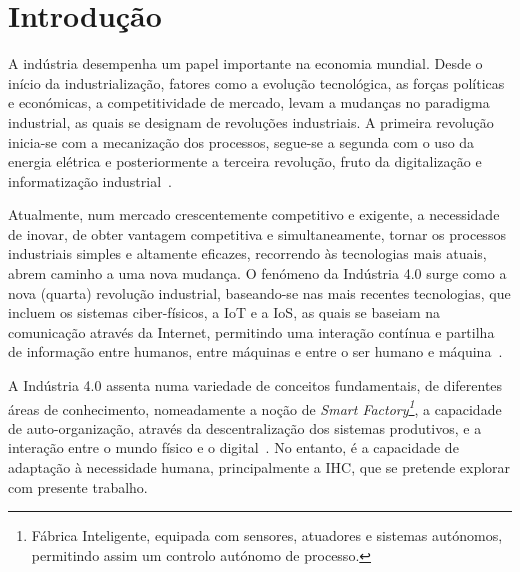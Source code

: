 \chapter{Introdução}
\label{chap:Chapter1}

A indústria desempenha um papel importante na economia mundial. Desde o início da industrialização, fatores como a evolução tecnológica, as forças políticas e económicas, a competitividade de mercado, levam a mudanças no paradigma industrial, as quais se designam de revoluções industriais. A primeira revolução inicia-se com a mecanização dos processos, segue-se a segunda com o uso da energia elétrica e posteriormente a terceira revolução, fruto da digitalização e informatização industrial~\parencite{industry40, modern_industrial_revolution_exit_failure_internal_control_systems}.

Atualmente, num mercado crescentemente competitivo e exigente, a necessidade de inovar, de obter vantagem competitiva e simultaneamente, tornar os processos industriais simples e altamente eficazes, recorrendo às tecnologias mais atuais, abrem caminho a uma nova mudança. O fenómeno da Indústria 4.0 surge como a nova (quarta) revolução industrial, baseando-se nas mais recentes tecnologias, que incluem os sistemas ciber-físicos, a \gls{IoT} e a \gls{IoS}, as quais se baseiam na comunicação através da Internet, permitindo uma interação contínua e partilha de informação entre humanos, entre máquinas e entre o ser humano e máquina~\parencite{complex_view_industry40}. 

A Indústria 4.0 assenta numa variedade de conceitos fundamentais, de diferentes áreas de conhecimento, nomeadamente a noção de \textit{Smart Factory\footnote{Fábrica Inteligente, equipada com sensores, atuadores e sistemas autónomos, permitindo assim um controlo autónomo de processo.}}, a capacidade de auto-organização, através da descentralização dos sistemas produtivos, e a interação entre o mundo físico e o digital~\parencite[Fundamental Concepts, p.240]{industry40}. No entanto, é a capacidade de adaptação à necessidade humana, principalmente a \gls{IHC}, que se pretende explorar com presente trabalho.

